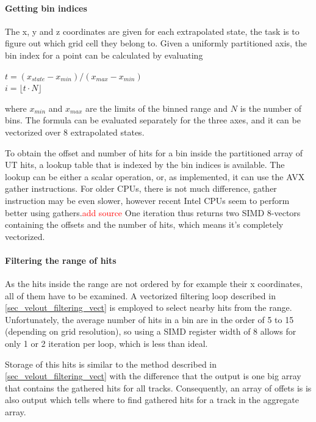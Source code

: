 \documentclass[12pt]{article}
\begin{document}
\paragraph{Getting bin indices} \mbox{}\vspace{0.4pc}

The x, y and z coordinates are given for each extrapolated state, the task is to figure out which grid cell they belong to. Given a uniformly partitioned axis, the bin index for a point can be calculated by evaluating
\begin{center}
	$t = (x_{state} - x_{min})/(x_{max} - x_{min})$\\
	$i =  \lfloor t \cdot N \rfloor$	
\end{center}
where $x_{min}$ and $x_{max}$ are the limits of the binned range and $N$ is the number of bins. The formula can be evaluated separately for the three axes, and it can be vectorized over 8 extrapolated states.

To obtain the offset and number of hits for a bin inside the partitioned array of UT hits, a lookup table that is indexed by the bin indices is available. The lookup can be either a scalar operation, or, as implemented, it can use the AVX gather instructions. For older CPUs, there is not much difference, gather instruction may be even slower, however recent Intel CPUs seem to perform better using gathers.\textcolor{red}{add source} One iteration thus returns two SIMD 8-vectors containing the offsets and the number of hits, which means it's completely vectorized.

\paragraph{Filtering the range of hits} \mbox{}\vspace{0.4pc}

As the hits inside the range are not ordered by for example their x coordinates, all of them have to be examined. A vectorized filtering loop described in \ref{sec_velout_filtering_vect} is employed to select nearby hits from the range. Unfortunately, the average number of hits in a bin are in the order of 5 to 15 (depending on grid resolution), so using a SIMD register width of 8 allows for only 1 or 2 iteration per loop, which is less than ideal.

Storage of this hits is similar to the method described in \ref{sec_velout_filtering_vect} with the difference that the output is one big array that contains the gathered hits for all tracks. Consequently, an array of offets is is also output which tells where to find gathered hits for a track in the aggregate array.
\end{document}

